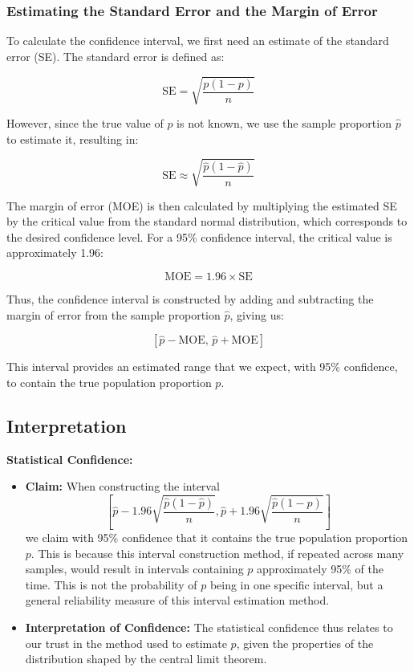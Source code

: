 \documentclass[11pt]{article}
\begin{document}
\subsubsection*{Estimating the Standard Error and the Margin of Error}

To calculate the confidence interval, we first need an estimate of the standard error (SE). The standard error is defined as:

\[
\text{SE} = \sqrt{\frac{p(1-p)}{n}}
\]

However, since the true value of \( p \) is not known, we use the sample proportion \( \hat{p} \) to estimate it, resulting in:

\[
\text{SE} \approx \sqrt{\frac{\hat{p}(1-\hat{p})}{n}}
\]

The margin of error (MOE) is then calculated by multiplying the estimated SE by the critical value from the standard normal distribution, which corresponds to the desired confidence level. For a 95\% confidence interval, the critical value is approximately 1.96:

\[
\text{MOE} = 1.96 \times \text{SE}
\]

Thus, the confidence interval is constructed by adding and subtracting the margin of error from the sample proportion \( \hat{p} \), giving us:

\[
\left[\hat{p} - \text{MOE}, \, \hat{p} + \text{MOE}\right]
\]

This interval provides an estimated range that we expect, with 95\% confidence, to contain the true population proportion \( p \).

\subsection*{Interpretation}

\textbf{Statistical Confidence:}
\begin{itemize}
  \item \textbf{Claim:} When constructing the interval
  \[\left[\hat{p} - 1.96\sqrt{\frac{\hat{p}(1-\hat{p})}{n}}, \hat{p} + 1.96\sqrt{\frac{\hat{p}(1-\hat{p})}{n}}\right]\]
  we claim with 95\% confidence that it contains the true population proportion \( p \). This is because this interval construction method, if repeated across many samples, would result in intervals containing \( p \) approximately 95\% of the time. This is not the probability of \( p \) being in one specific interval, but a general reliability measure of this interval estimation method.
  \item \textbf{Interpretation of Confidence:} The statistical confidence thus relates to our trust in the method used to estimate \( p \), given the properties of the distribution shaped by the central limit theorem.
\end{itemize}
\end{document}
